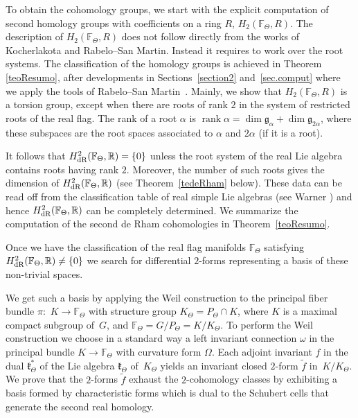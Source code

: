\documentclass[10pt,a4paper]{amsart}
\numberwithin{equation}{section}
\begin{document}
To obtain the cohomology groups, we start with the explicit computation of second homology groups with coefficients on a ring $R$, $H_{2}(\mathbb{F}_\Theta,R)$. The description of $H_{2}(\mathbb{F}_\Theta,R)$ does not follow directly from the works of Kocherlakota and Rabelo--San Martin. Instead it requires to work over the root systems. The classification of the homology groups is achieved in Theorem \ref{teoResumo}, after developments in Sections~\ref{section2} and~\ref{sec.comput} where we apply the tools of Rabelo--San Martin~\cite{RSM}. Mainly, we show that $H_{2}(\mathbb{F}_\Theta,R)$ is a torsion group, except when there are roots of rank $2$ in the system of restricted roots of the real flag. The rank of a root $\alpha $ is $\operatorname{rank} \alpha =\dim \mathfrak{g}_{\alpha }+\dim \mathfrak{g}_{2\alpha }$, where these subspaces are the root spaces associated to $\alpha$ and $2\alpha$ (if it is a root).

It follows that $H_{\rm dR}^{2}(\mathbb{F}_{\Theta },\mathbb{R})=\{0\}$ unless the root system of the real Lie algebra contains roots having rank $2$. Moreover, the number of such roots gives the dimension of $H_{\rm dR}^{2}(\mathbb{F}_{\Theta },\mathbb{R})$ (see Theorem~\ref{tedeRham} below). These data can be read off from the classification table of real simple Lie algebras (see Warner \cite[pp.~30--32]{WarG}) and hence $H_{\rm dR}^{2}(\mathbb{F}_{\Theta },\mathbb{R})$ can be completely determined. We summarize the computation of the second de Rham cohomologies in Theorem~\ref{teoResumo}.

Once we have the classification of the real flag manifolds $\mathbb{F}_{\Theta }$ satisfying $H_{\rm dR}^{2}(\mathbb{F}_{\Theta },\mathbb{R})\neq \{0\}$ we search for differential $2$-forms representing a basis of these non-trivial spaces.

We get such a basis by applying the Weil construction to the principal fiber bundle $\pi \colon$ $K\longrightarrow \mathbb{F}_{\Theta }$ with structure group $K_{\Theta }=P_{\Theta }\cap K$, where $K$ is a maximal compact subgroup of~$G$, and $\mathbb{F}_{\Theta }=G/P_{\Theta }=K/K_{\Theta }$. To perform the Weil construction we choose in a standard way a left invariant connection $\omega $ in the principal bundle $K\longrightarrow \mathbb{F}_{\Theta }$ with curvature form $\Omega $. Each adjoint invariant $f$ in the dual $\mathfrak{k}_{\Theta }^{\ast }$ of the Lie algebra $\mathfrak{k}_{\Theta }$ of~$K_{\Theta }$ yields an invariant closed $2$-form $\widetilde{f}$ in~$K/K_{\Theta }$. We prove that the $2$-forms $\widetilde{f}$ exhaust the $2$-cohomology classes by exhibiting a basis formed by characteristic forms which is dual to the Schubert cells that generate the second real homology.
\end{document}
